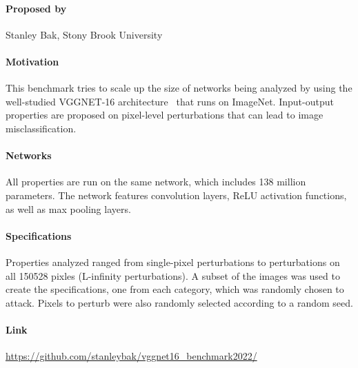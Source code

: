 \documentclass[oneside,11pt,dvipsnames]{book}
\numberwithin{equation}{section}
\theoremstyle{definition}
\theoremstyle{remark}
\begin{document}
\paragraph*{Proposed by} Stanley Bak, Stony Brook University

\paragraph*{Motivation} This benchmark tries to scale up the size of networks being analyzed by using the well-studied VGGNET-16 architecture~\cite{simonyan2014very} that runs on ImageNet. Input-output properties are proposed on pixel-level perturbations that can lead to image misclassification. 

\paragraph*{Networks} All properties are run on the same network, which includes 138 million parameters. The network features convolution layers, ReLU activation functions, as well as max pooling layers.

\paragraph*{Specifications} Properties analyzed ranged from single-pixel perturbations to perturbations on all 150528 pixles (L-infinity perturbations). A subset of the images was used to create the specifications, one from each category, which was randomly chosen to attack. Pixels to perturb were also randomly selected according to a random seed.

\paragraph*{Link} \url{https://github.com/stanleybak/vggnet16_benchmark2022/}
\end{document}
